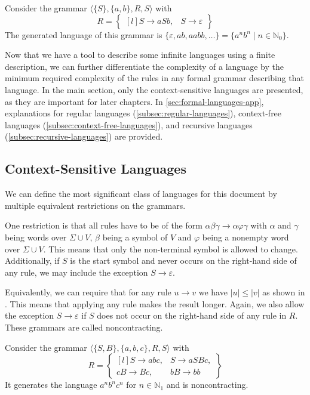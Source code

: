 \begin{exmp}
    Consider the grammar $\langle \{S\}, \{a, b\}, R, S \rangle$ with
    \[
        R = \begin{Bmatrix*}[l]
                S \to aSb,
                &S \to \varepsilon
        \end{Bmatrix*}
    \]
    The generated language of this grammar is $\{\varepsilon, ab, aabb, \dots\} = \{a^{n}b^{n} \mid n \in \mathbb{N}_0\}$.
\end{exmp}

Now that we have a tool to describe some infinite languages using a finite description, we can further differentiate the complexity of a language by the minimum required complexity of the rules in any formal grammar describing that language.
In the main section, only the context-sensitive languages are presented, as they are important for later chapters.
In \cref{sec:formal-languages-app}, explanations for regular languages (\cref{subsec:regular-languages}), context-free languages (\cref{subsec:context-free-languages}), and recursive languages (\cref{subsec:recursive-languages}) are provided.

\subsection{Context-Sensitive Languages}\label{subsec:context-sensitive-languages}

We can define the most significant class of languages for this document by multiple equivalent restrictions on the grammars.

One restriction is that all rules have to be of the form $\alpha\beta\gamma \to \alpha\varphi\gamma$ with $\alpha$ and $\gamma$ being words over $\Sigma \cup V$, $\beta$ being a symbol of $V$ and $\varphi$ being a nonempty word over $\Sigma \cup V$.
This means that only the non-terminal symbol is allowed to change.
Additionally, if $S$ is the start symbol and never occurs on the right-hand side of any rule, we may include the exception $S \to \varepsilon$.

Equivalently, we can require that for any rule $u \to v$ we have $|u| \leq |v|$ as shown in \cite{Parkes2002}.
This means that applying any rule makes the result longer.
Again, we also allow the exception $S \to \varepsilon$ if $S$ does not occur on the right-hand side of any rule in $R$.
These grammars are called noncontracting.

\begin{exmp}
    Consider the grammar $\langle \{S, B\}, \{a, b, c\}, R, S \rangle$ with
    \[
        R = \begin{Bmatrix*}[l]
                S \to abc, &S \to aSBc, \\
                cB \to Bc, &bB \to bb
        \end{Bmatrix*}
    \]
    It generates the language $a^{n}b^{n}c^{n}$ for $n \in \mathbb{N}_{1}$ and is noncontracting.
\end{exmp}

